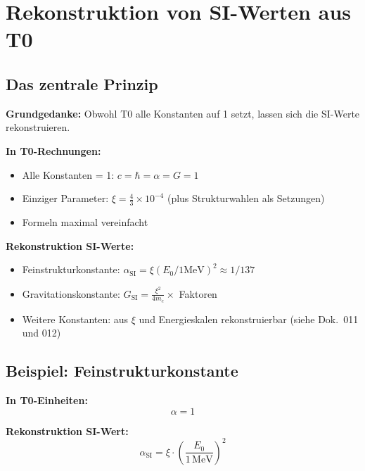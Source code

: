 	\section{Rekonstruktion von SI-Werten aus T0}
	\label{sec:si_reconstruction}
	
	\subsection{Das zentrale Prinzip}
	
	\textbf{Grundgedanke:} Obwohl T0 alle Konstanten auf 1 setzt, lassen sich die SI-Werte rekonstruieren.
	
	\begin{tcolorbox}[colback=green!5!white,colframe=green!75!black,title=T0-Rekonstruktion]
		\textbf{In T0-Rechnungen:}
		\begin{itemize}
			\item Alle Konstanten = 1: $c = \hbar = \alpha = G = 1$
			\item Einziger Parameter: $\xi = \frac{4}{3} \times 10^{-4}$ (plus Strukturwahlen als Setzungen)
			\item Formeln maximal vereinfacht
		\end{itemize}
		
		\textbf{Rekonstruktion SI-Werte:}
		\begin{itemize}
			\item Feinstrukturkonstante: $\alpha_{\text{SI}} = \xi(E_0/1\text{MeV})^2 \approx 1/137$
			\item Gravitationskonstante: $G_{\text{SI}} = \frac{\xi^2}{4m_e} \times$ Faktoren
			\item Weitere Konstanten: aus $\xi$ und Energieskalen rekonstruierbar (siehe Dok.~011 und 012)
		\end{itemize}
	\end{tcolorbox}
	
	\subsection{Beispiel: Feinstrukturkonstante}
	
	\textbf{In T0-Einheiten:}
	\begin{equation}
		\alpha = 1
	\end{equation}
	
	\textbf{Rekonstruktion SI-Wert:}
	\begin{equation}
		\alpha_{\text{SI}} = \xi \cdot \left(\frac{E_0}{1\,\text{MeV}}\right)^2
	\end{equation}
	
